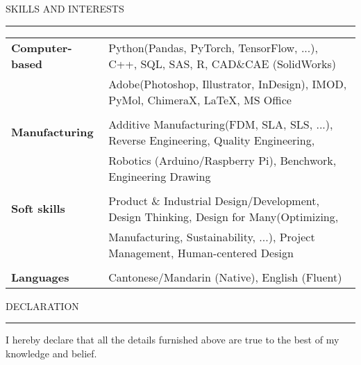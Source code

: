 \documentclass{resume} %
\renewenvironment{rSection}[1]{
\sectionskip
\textcolor{TsinghuaPurple}{\MakeUppercase{#1}}
\sectionlineskip
\hrule
\begin{list}{}{
\setlength{\leftmargin}{0em}
}
\item[]
}{
\end{list}
}
\begin{document}

\begin{rSection}{skills and INTERESTS}

\begin{tabular}{ @{} >{\bfseries}l @{\hspace{6ex}} l }  
Computer-based  & Python(Pandas, PyTorch, TensorFlow, ...), C++, SQL, SAS, R, CAD\&CAE (SolidWorks)\\
                & Adobe(Photoshop, Illustrator, InDesign), IMOD, PyMol, ChimeraX, LaTeX, MS Office\\
                \\
Manufacturing   & Additive Manufacturing(FDM, SLA, SLS, ...), Reverse Engineering, Quality Engineering,\\
                & Robotics (Arduino/Raspberry Pi), Benchwork, Engineering Drawing\\
                \\
Soft skills     & Product \& Industrial Design/Development, Design Thinking, Design for Many(Optimizing,\\
                & Manufacturing, Sustainability, ...), Project Management, Human-centered Design\\
                \\
Languages   & Cantonese/Mandarin (Native), English (Fluent)\\

\end{tabular}   

\end{rSection}



\begin{rSection}{ Declaration  } \itemsep -3pt        

\item I hereby declare that all the details furnished above are true to the best of my knowledge and belief.   
  
\end{rSection}
\end{document}
